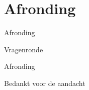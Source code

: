 \documentclass{beamer}
\begin{document}
\part{Afronding}
\begin{frame}{Afronding}
\begin{center}
Vragenronde
\end{center}
\end{frame}
\begin{frame}{Afronding}
\begin{center}
Bedankt voor de aandacht
\end{center}
\end{frame}


\HoGentLogo
\end{document}

